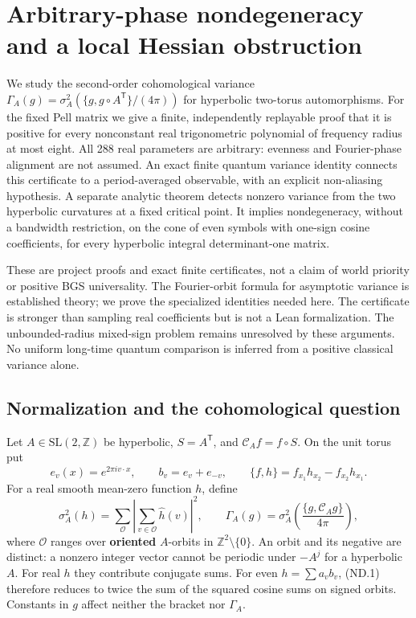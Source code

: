 \section{Arbitrary-phase nondegeneracy and a local Hessian obstruction}\label{sec:nondegeneracy}
We study the second-order cohomological variance \(\Gamma_A(g)=\sigma_A^2(\{g,g\circ A^{\mathsf T}\}/(4\pi))\) for hyperbolic two-torus automorphisms. For the fixed Pell matrix we give a finite, independently replayable proof that it is positive for every nonconstant real trigonometric polynomial of frequency radius at most eight. All 288 real parameters are arbitrary: evenness and Fourier-phase alignment are not assumed. An exact finite quantum variance identity connects this certificate to a period-averaged observable, with an explicit non-aliasing hypothesis. A separate analytic theorem detects nonzero variance from the two hyperbolic curvatures at a fixed critical point. It implies nondegeneracy, without a bandwidth restriction, on the cone of even symbols with one-sign cosine coefficients, for every hyperbolic integral determinant-one matrix.

These are project proofs and exact finite certificates, not a claim of world priority or positive BGS universality. The Fourier-orbit formula for asymptotic variance is established theory; we prove the specialized identities needed here. The certificate is stronger than sampling real coefficients but is not a Lean formalization. The unbounded-radius mixed-sign problem remains unresolved by these arguments. No uniform long-time quantum comparison is inferred from a positive classical variance alone.

\subsection{Normalization and the cohomological question}\label{nondegeneracy:normalization-and-the-cohomological-question}

Let \(A\in\mathrm{SL}(2,\mathbb Z)\) be hyperbolic, \(S=A^{\mathsf T}\), and \(\mathcal C_A f=f\circ S\). On the unit torus put \[
 e_v(x)=e^{2\pi i v\cdot x},\qquad b_v=e_v+e_{-v},\qquad
 \{f,h\}=f_{x_1}h_{x_2}-f_{x_2}h_{x_1}.
\] For a real smooth mean-zero function \(h\), define \[
 \sigma_A^2(h)=\sum_{\mathcal O}
       \left|\sum_{v\in\mathcal O}\widehat h(v)\right|^2,
 \qquad
 \Gamma_A(g)=\sigma_A^2\!\left(\frac{\{g,\mathcal C_Ag\}}{4\pi}\right),
 \tag{ND.1}
\] where \(\mathcal O\) ranges over \textbf{oriented} \(A\)-orbits in \(\mathbb Z^2\setminus\{0\}\). An orbit and its negative are distinct: a nonzero integer vector cannot be periodic under \(-A^j\) for a hyperbolic \(A\). For real \(h\) they contribute conjugate sums. For even \(h=\sum a_v b_v\), (ND.1) therefore reduces to twice the sum of the squared cosine sums on signed orbits. Constants in \(g\) affect neither the bracket nor \(\Gamma_A\).

